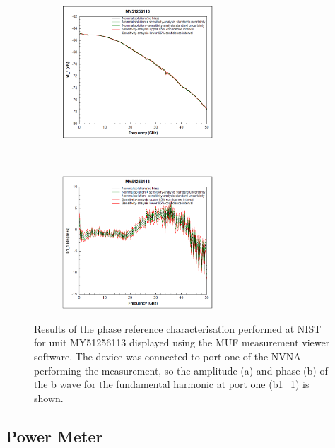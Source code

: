 \documentclass[../thesis/thesis.tex]{subfiles}
\begin{document}
\begin{refsection}
\begin{figure}
	\centering
	\begin{subfigure}{\textwidth}
		\centering
		\includegraphics[width=0.62\textwidth]{combuncA.png}
		\caption{ }
	\end{subfigure}
	\\
	\begin{subfigure}{\textwidth}
		\centering
		\includegraphics[width=0.62\textwidth]{combuncP.png}
		\caption{ }
	\end{subfigure}
	\caption[Results of the phase reference characterisation performed at NIST for unit MY51256113 displayed using the MUF measurement viewer software.]{Results of the phase reference characterisation performed at NIST for unit MY51256113 displayed using the MUF measurement viewer software. The device was connected to port one of the NVNA performing the measurement, so the amplitude (a) and phase (b) of the b wave for the fundamental harmonic at port one (b1\_1) is shown.}
	\label{ch4_fig_combunc}
\end{figure}

\subsection{Power Meter}


\end{refsection}
\end{document}
